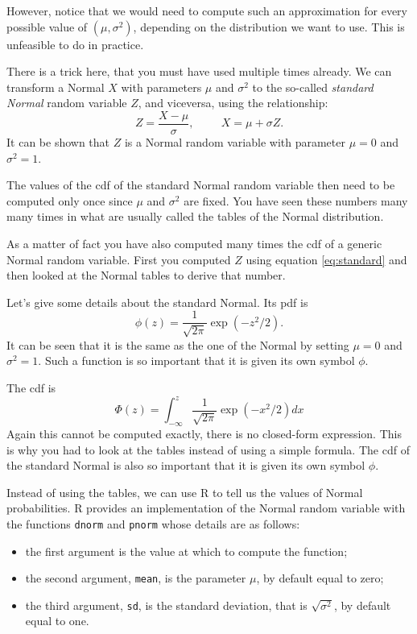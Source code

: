 \documentclass[
]{book}
\theoremstyle{definition}
\theoremstyle{definition}
\theoremstyle{definition}
\theoremstyle{definition}
\theoremstyle{remark}
\begin{document}
However, notice that we would need to compute such an approximation for every possible value of \((\mu,\sigma^2)\), depending on the distribution we want to use. This is unfeasible to do in practice.

There is a trick here, that you must have used multiple times already. We can transform a Normal \(X\) with parameters \(\mu\) and \(\sigma^2\) to the so-called \emph{standard Normal} random variable \(Z\), and viceversa, using the relationship:
\begin{equation}
 \label{eq:standard}
Z = \frac{X-\mu}{\sigma}, \hspace{1cm} X= \mu + \sigma Z.
\end{equation}
It can be shown that \(Z\) is a Normal random variable with parameter \(\mu=0\) and \(\sigma^2=1\).

The values of the cdf of the standard Normal random variable then need to be computed only once since \(\mu\) and \(\sigma^2\) are fixed. You have seen these numbers many many times in what are usually called the tables of the Normal distribution.

As a matter of fact you have also computed many times the cdf of a generic Normal random variable. First you computed \(Z\) using equation \eqref{eq:standard} and then looked at the Normal tables to derive that number.

Let's give some details about the standard Normal. Its pdf is
\[
\phi(z)=\frac{1}{\sqrt{2\pi}}\exp\left(-z^2/2\right).
\]
It can be seen that it is the same as the one of the Normal by setting \(\mu=0\) and \(\sigma^2=1\). Such a function is so important that it is given its own symbol \(\phi\).

The cdf is
\[
\Phi(z)=\int_{-\infty}^z\frac{1}{\sqrt{2\pi}}\exp\left(-x^2/2\right)dx
\]
Again this cannot be computed exactly, there is no closed-form expression. This is why you had to look at the tables instead of using a simple formula. The cdf of the standard Normal is also so important that it is given its own symbol \(\phi\).

Instead of using the tables, we can use R to tell us the values of Normal probabilities. R provides an implementation of the Normal random variable with the functions \texttt{dnorm} and \texttt{pnorm} whose details are as follows:

\begin{itemize}
\item
  the first argument is the value at which to compute the function;
\item
  the second argument, \texttt{mean}, is the parameter \(\mu\), by default equal to zero;
\item
  the third argument, \texttt{sd}, is the standard deviation, that is \(\sqrt{\sigma^2}\), by default equal to one.
\end{itemize}
\end{document}

